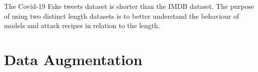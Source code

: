 \documentclass[%
	BCOR=8mm, %
	DIV=12,
	toc=bibliography, %
	toc=listof, %
	oneside, %
	egregdoesnotlikesansseriftitles, %
	]{scrbook}
\begin{document}
The Covid-19 Fake tweets dataset is shorter than the IMDB dataset. The purpose of using two distinct length datasets is to better understand the behaviour of models and attack recipes in relation to the length.

\section{Data Augmentation}
\label{section:dataaugmentation}
\end{document}
